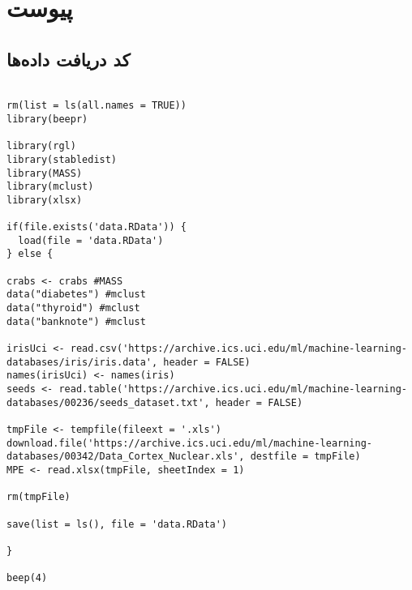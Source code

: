 \chapter*{‌پیوست}

\section*{
کد دریافت داده‌ها }
\begin{latin}
\begin{Verbatim}[breaklines=true, breakanywhere=true, baselinestretch=1]

rm(list = ls(all.names = TRUE))
library(beepr)

library(rgl)
library(stabledist)
library(MASS)
library(mclust)
library(xlsx)

if(file.exists('data.RData')) {
  load(file = 'data.RData')
} else {

crabs <- crabs #MASS
data("diabetes") #mclust
data("thyroid") #mclust
data("banknote") #mclust

irisUci <- read.csv('https://archive.ics.uci.edu/ml/machine-learning-databases/iris/iris.data', header = FALSE)
names(irisUci) <- names(iris)
seeds <- read.table('https://archive.ics.uci.edu/ml/machine-learning-databases/00236/seeds_dataset.txt', header = FALSE)

tmpFile <- tempfile(fileext = '.xls')
download.file('https://archive.ics.uci.edu/ml/machine-learning-databases/00342/Data_Cortex_Nuclear.xls', destfile = tmpFile)
MPE <- read.xlsx(tmpFile, sheetIndex = 1)

rm(tmpFile)

save(list = ls(), file = 'data.RData')

}

beep(4)


\end{Verbatim}
\end{latin}

